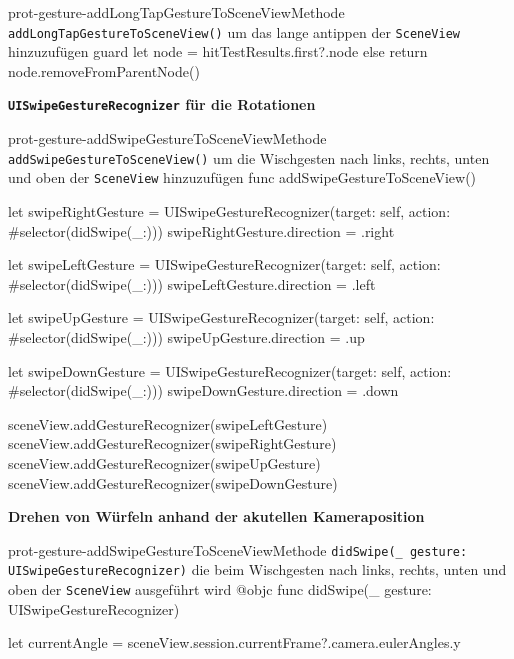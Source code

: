 \begin{description}
\begin{code}{prot-gesture-addLongTapGestureToSceneView}{Methode \texttt{addLongTapGestureToSceneView()} um das lange antippen der \texttt{SceneView} hinzuzufügen}
{        guard let node = hitTestResults.first?.node else { return }
        node.removeFromParentNode()
    }
    \end{code}
    
    \textbf{\texttt{UISwipeGestureRecognizer} für die Rotationen}\\
    
    \begin{code}{prot-gesture-addSwipeGestureToSceneView}{Methode \texttt{addSwipeGestureToSceneView()} um die Wischgesten nach links, rechts, unten und oben der \texttt{SceneView} hinzuzufügen}
    func addSwipeGestureToSceneView() {
        let swipeRightGesture = UISwipeGestureRecognizer(target: self, action: #selector(didSwipe(_:)))
        swipeRightGesture.direction = .right
        
        let swipeLeftGesture = UISwipeGestureRecognizer(target: self, action: #selector(didSwipe(_:)))
        swipeLeftGesture.direction = .left
        
        let swipeUpGesture = UISwipeGestureRecognizer(target: self, action: #selector(didSwipe(_:)))
        swipeUpGesture.direction = .up
        
        let swipeDownGesture = UISwipeGestureRecognizer(target: self, action: #selector(didSwipe(_:)))
        swipeDownGesture.direction = .down
        
        sceneView.addGestureRecognizer(swipeLeftGesture)
        sceneView.addGestureRecognizer(swipeRightGesture)
        sceneView.addGestureRecognizer(swipeUpGesture)
        sceneView.addGestureRecognizer(swipeDownGesture)
    }
    \end{code}


    \textbf{Drehen von Würfeln anhand der akutellen Kameraposition}\\

    \begin{code}{prot-gesture-addSwipeGestureToSceneView}{Methode \texttt{didSwipe(\_ gesture: UISwipeGestureRecognizer)} die beim Wischgesten nach links, rechts, unten und oben der \texttt{SceneView} ausgeführt wird}
    @objc
    func didSwipe(_ gesture: UISwipeGestureRecognizer) {
        let currentAngle = sceneView.session.currentFrame?.camera.eulerAngles.y
        
}
\end{code}
\end{description}
